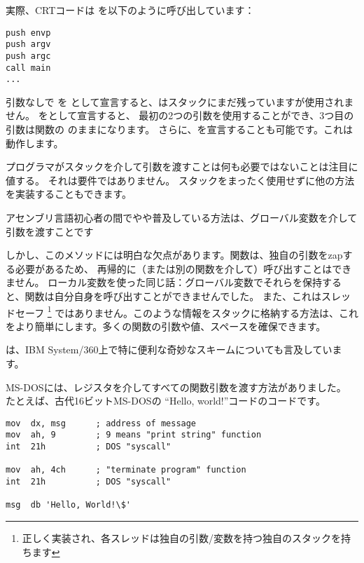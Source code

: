 実際、\ac{CRT}コードは \main を以下のように呼び出しています：
	
\begin{lstlisting}[style=customasmx86]
push envp
push argv
push argc
call main
...
\end{lstlisting}

引数なしで \main を \main として宣言すると、\main はスタックにまだ残っていますが使用されません。 
\main をとして宣言すると、
最初の2つの引数を使用することができ、3つ目の引数は関数の のままになります。 
さらに、を宣言することも可能です。これは動作します。


プログラマがスタックを介して引数を渡すことは何も必要ではないことは注目に値する。
それは要件ではありません。 スタックをまったく使用せずに他の方法を実装することもできます。

アセンブリ言語初心者の間でやや普及している方法は、グローバル変数を介して引数を渡すことです



しかし、このメソッドには明白な欠点があります。関数は、独自の引数をzapする必要があるため、
再帰的に（または別の関数を介して）呼び出すことはできません。 
ローカル変数を使った同じ話：グローバル変数でそれらを保持すると、関数は自分自身を呼び出すことができませんでした。 
また、これはスレッドセーフ
\footnote{正しく実装され、各スレッドは独自の引数/変数を持つ独自のスタックを持ちます}
ではありません。このような情報をスタックに格納する方法は、これをより簡単にします。多くの関数の引数や値、スペースを確保できます。

は、IBM System/360上で特に便利な奇妙なスキームについても言及しています。


MS-DOSには、レジスタを介してすべての関数引数を渡す方法がありました。
たとえば、古代16ビットMS-DOSの ``Hello, world!''コードのコードです。

\begin{lstlisting}[style=customasmx86]
mov  dx, msg      ; address of message
mov  ah, 9        ; 9 means "print string" function
int  21h          ; DOS "syscall"

mov  ah, 4ch      ; "terminate program" function
int  21h          ; DOS "syscall"

msg  db 'Hello, World!\$'
\end{lstlisting}

